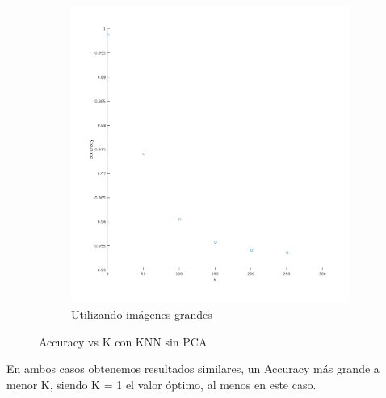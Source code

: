 \begin{figure}[H]
\begin{subfigure}[h]{0.62\linewidth}
\includegraphics[width=\linewidth]{img/big_k_knn_accu.png}
\caption{Utilizando imágenes grandes}
\end{subfigure}%
\caption{Accuracy vs K con KNN sin PCA}
\end{figure}

En ambos casos obtenemos resultados similares, un Accuracy más grande a menor K, siendo K = 1 el valor óptimo, al menos en este caso.


